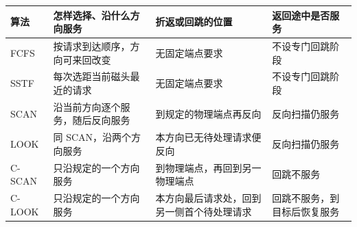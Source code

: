 \begin{wideblock}

\par\medskip\noindent\begin{minipage}{\linewidth}\fontsize{9.3}{12}\selectfont\begin{tabularx}{\linewidth}{@{}YYYY@{}}
\toprule\noalign{}
\begin{minipage}[b]{\linewidth}\raggedright
算法
\end{minipage} & \begin{minipage}[b]{\linewidth}\raggedright
怎样选择、沿什么方向服务
\end{minipage} & \begin{minipage}[b]{\linewidth}\raggedright
折返或回跳的位置
\end{minipage} & \begin{minipage}[b]{\linewidth}\raggedright
返回途中是否服务
\end{minipage} \\
\midrule\noalign{}


FCFS & 按请求到达顺序，方向可来回改变 & 无固定端点要求 & 不设专门回跳阶段 \\
SSTF & 每次选距当前磁头最近的请求 & 无固定端点要求 & 不设专门回跳阶段 \\
SCAN & 沿当前方向逐个服务，随后反向服务 & 到规定的物理端点再反向 & 反向扫描仍服务 \\
LOOK & 同 SCAN，沿两个方向服务 & 本方向已无待处理请求便反向 & 反向扫描仍服务 \\
C-SCAN & 只沿规定的一个方向服务 & 到物理端点，再回到另一物理端点 & 回跳不服务 \\
C-LOOK & 只沿规定的一个方向服务 & 本方向最后请求处，回到另一侧首个待处理请求 & 回跳不服务，到目标后恢复服务 \\
\bottomrule\end{tabularx}
\end{minipage}\par\medskip

\end{wideblock}

